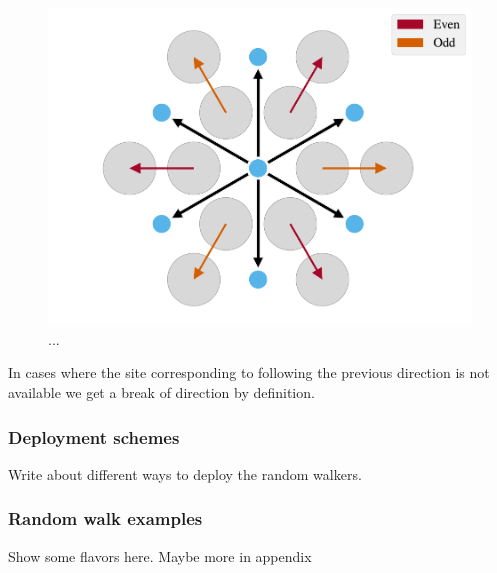 \begin{figure}[H]
  \centering
  \includegraphics[width=0.5\linewidth]{figures/system/stay_or_break.pdf}
  \caption{...}
  \label{fig:stay_or_break}
\end{figure}


In cases where the site corresponding to following the previous direction is not available we get a break of direction by definition. 

\subsubsection{Deployment schemes}

Write about different ways to deploy the random walkers. 



\subsubsection{Random walk examples}

Show some flavors here. Maybe more in appendix
